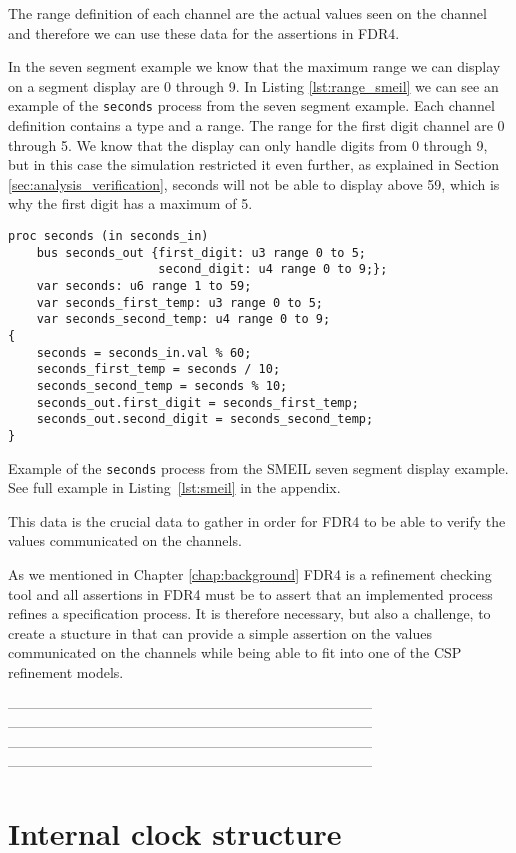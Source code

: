 The range definition of each channel are the actual values seen on the channel and therefore we can use these data for the assertions in FDR4.

In the seven segment example we know that the maximum range we can display on a segment display are 0 through 9. In Listing \ref{lst:range_smeil} we can see an example of the \texttt{seconds} process from the seven segment example.
Each channel definition contains a type and a range. The range for the first digit channel are 0 through 5. We know that the display can only handle digits from 0 through 9, but in this case the simulation restricted it even further, as explained in Section \ref{sec:analysis_verification}, seconds will not be able to display above 59, which is why the first digit has a maximum of 5.
\begin{listing}
\begin{verbatim}
proc seconds (in seconds_in)
    bus seconds_out {first_digit: u3 range 0 to 5;
                     second_digit: u4 range 0 to 9;};
    var seconds: u6 range 1 to 59;
    var seconds_first_temp: u3 range 0 to 5;
    var seconds_second_temp: u4 range 0 to 9;
{
    seconds = seconds_in.val % 60;
    seconds_first_temp = seconds / 10;
    seconds_second_temp = seconds % 10;
    seconds_out.first_digit = seconds_first_temp;
    seconds_out.second_digit = seconds_second_temp;
}
\end{verbatim}
\caption{Example of the \texttt{seconds} process from the SMEIL seven segment display example. See full example in Listing~\ref{lst:smeil} in the appendix.}
\label{lst:range_smeil}
\end{listing}

This data is the crucial data to gather in order for FDR4 to be able to verify the values communicated on the channels.

As we mentioned in Chapter \ref{chap:background} FDR4 is a refinement checking tool and all assertions in FDR4 must be to assert that an implemented process refines a specification process.
It is therefore necessary, but also a challenge, to create a stucture in \cspm{} that can provide a simple assertion on the values communicated on the channels while being able to fit into one of the CSP refinement models.


------------------------------------------------------------------------------\\
------------------------------------------------------------------------------\\
------------------------------------------------------------------------------\\
------------------------------------------------------------------------------\\



\section{Internal clock structure} \label{sec:analysis_clock}
